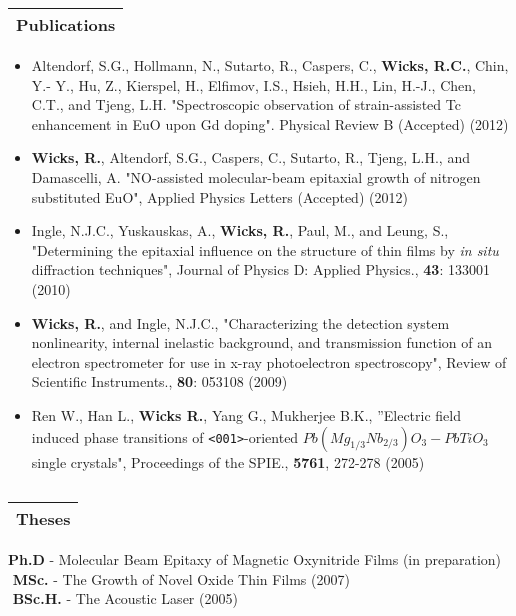 \documentclass[letterpaper,12pt]{article}
\begin{document}
\noindent \Large \begin{tabular}{|p{12cm}|} \hline \textbf{Publications}\\ \hline \end{tabular} \normalsize
\linebreak
\begin{itemize}
\item{Altendorf, S.G., Hollmann, N., Sutarto, R., Caspers, C., \textbf{Wicks, R.C.}, Chin, Y.- Y., Hu, Z., Kierspel, H., Elfimov, I.S., Hsieh, H.H., Lin, H.-J., Chen, C.T., and Tjeng, L.H. "Spectroscopic observation of strain-assisted Tc enhancement in EuO upon Gd doping". Physical Review B (Accepted) (2012)}
\item {\textbf{Wicks, R.}, Altendorf, S.G., Caspers, C., Sutarto, R., Tjeng, L.H., and Damascelli, A.
"NO-assisted molecular-beam epitaxial growth of nitrogen substituted EuO", Applied Physics Letters (Accepted) (2012)}
\item{Ingle, N.J.C., Yuskauskas, A., \textbf{Wicks, R.}, Paul, M., and Leung, S., "Determining the epitaxial influence on the structure of thin films by \textit{in situ} diffraction techniques",  Journal of Physics D: Applied Physics., \textbf{43}: 133001 (2010)}
\item{\textbf{Wicks, R.}, and Ingle, N.J.C., "Characterizing the detection system nonlinearity, internal inelastic background, and transmission function of an electron spectrometer for use in x-ray photoelectron spectroscopy", Review of Scientific Instruments., \textbf{80}: 053108 (2009) }   
\item{Ren W., Han L., \textbf{Wicks R.}, Yang G., Mukherjee B.K., ''Electric field induced phase transitions of  \verb|<001>|-oriented $Pb(Mg_{1/3}Nb_{2/3})O_3-PbTiO_3$ single crystals", Proceedings of the SPIE., \textbf{5761}, 272-278 (2005)}
\end{itemize}
$ $\\

\noindent \Large \begin{tabular}{|p{12cm}|} \hline \textbf{Theses}\\ \hline \end{tabular} \normalsize
\linebreak
\linebreak
\noindent \textbf{Ph.D} - Molecular Beam Epitaxy of Magnetic Oxynitride Films (in preparation)\\
$ $ \linebreak
\noindent \textbf{MSc.} - The Growth of Novel Oxide Thin Films (2007)\\
$ $ \linebreak
\noindent \textbf{BSc.H.} -  The Acoustic Laser (2005)\\
$ $ \linebreak
$ $\\
\end{document}
